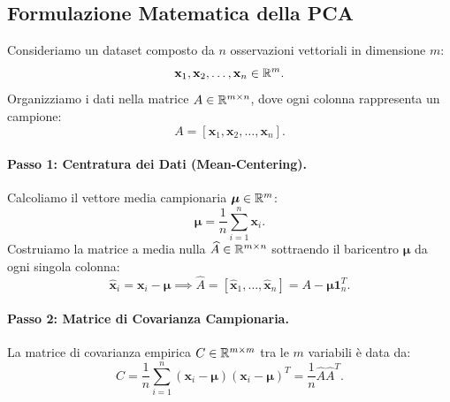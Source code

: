 \subsection{Formulazione Matematica della PCA}

Consideriamo un dataset composto da $n$ osservazioni vettoriali in dimensione $m$:
\begin{equation}
    \mathbf{x}_1, \mathbf{x}_2, \dots, \mathbf{x}_n \in \mathbb{R}^m.
\end{equation}
Organizziamo i dati nella matrice $A \in \mathbb{R}^{m \times n}$, dove ogni colonna rappresenta un campione:
\begin{equation}
    A = [\mathbf{x}_1, \mathbf{x}_2, \dots, \mathbf{x}_n].
\end{equation}

\paragraph{Passo 1: Centratura dei Dati (Mean-Centering).}
Calcoliamo il vettore media campionaria $\boldsymbol{\mu} \in \mathbb{R}^m$:
\begin{equation}
    \boldsymbol{\mu} = \frac{1}{n} \sum_{i=1}^n \mathbf{x}_i.
\end{equation}
Costruiamo la matrice a media nulla $\widehat{A} \in \mathbb{R}^{m \times n}$ sottraendo il baricentro $\boldsymbol{\mu}$ da ogni singola colonna:
\begin{equation}
    \widehat{\mathbf{x}}_i = \mathbf{x}_i - \boldsymbol{\mu} \implies \widehat{A} = [\widehat{\mathbf{x}}_1, \dots, \widehat{\mathbf{x}}_n] = A - \boldsymbol{\mu} \mathbf{1}_n^T.
\end{equation}

\paragraph{Passo 2: Matrice di Covarianza Campionaria.}
La matrice di covarianza empirica $C \in \mathbb{R}^{m \times m}$ tra le $m$ variabili \`e data da:
\begin{equation}
    C = \frac{1}{n} \sum_{i=1}^n (\mathbf{x}_i - \boldsymbol{\mu})(\mathbf{x}_i - \boldsymbol{\mu})^T = \frac{1}{n} \widehat{A} \widehat{A}^T.
\end{equation}


